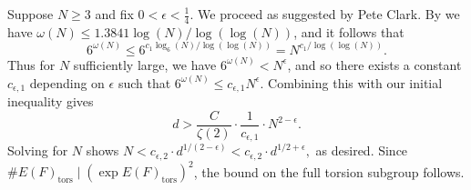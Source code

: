 \documentclass{amsart}
\theoremstyle{definition}
\newcommand{\tors}{\operatorname{tors}}
\begin{document}
    Suppose $N \geq 3$ and fix $0 < \epsilon <\frac{1}{4}$. We proceed as suggested by Pete Clark. By \cite[Theorem 11]{Robin83} we have $\omega(N)\leq 1.3841 \log(N)/\log(\log(N))$, and
    it follows that
    \[
    6^{\omega(N)}\leq 6^{c_1 \log_6(N)/\log(\log(N))}=N^{c_1/\log(\log(N))}.
    \]
    Thus for $N$ sufficiently large, we have $6^{\omega(N)}<N^{\epsilon}$, and so there exists a constant $c_{\epsilon,1}$ depending on $\epsilon$ such that $6^{\omega(N)}\leq c_{\epsilon,1} N^{\epsilon}$. Combining this with our initial inequality gives 
    \[
    d > \frac{C}{\zeta(2)}\cdot \frac{1}{c_{\epsilon,1}} \cdot N^{2-\epsilon}.
    \]
    Solving for $N$ shows 
     $
     N < c_{\epsilon,2} \cdot d^{1/(2-\epsilon)}<c_{\epsilon,2} \cdot d^{1/2 +\epsilon},
    $ as desired. Since $\#E(F)_{\tors} \mid (\exp E(F)_{\tors})^2$, the bound on the full torsion subgroup follows.

\end{document}
